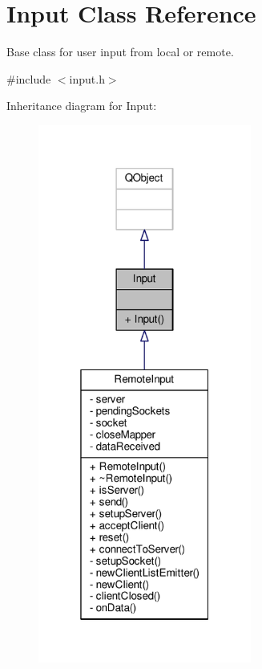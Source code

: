 \hypertarget{classInput}{}\section{Input Class Reference}
\label{classInput}


Base class for user input from local or remote.  




{\ttfamily \#include $<$input.\+h$>$}



Inheritance diagram for Input\+:
\nopagebreak
\begin{figure}[H]
\begin{center}
\leavevmode
\includegraphics[width=199pt]{classInput__inherit__graph}
\end{center}
\end{figure}


